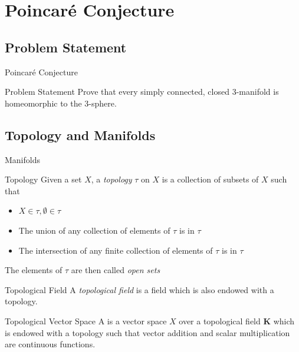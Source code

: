 \documentclass[handout]{beamer}
\newcommand{\Poincare}{Poincar\'{e}}
\begin{document}
  \section{\Poincare{} Conjecture}
  \subsection{Problem Statement}
  \begin{frame}{\Poincare{} Conjecture}
      \begin{block}{Problem Statement}
          Prove that every simply connected, closed 3-manifold is
          homeomorphic to the 3-sphere.
      \end{block}
  \end{frame}
  \subsection{Topology and Manifolds}
  \begin{frame}{Manifolds}
      \linespread{0.9}
      \pause
      \begin{block}{Topology}
          Given a set $X$, a \textit{topology} $\tau$ on $X$ is a collection of
          subsets of $X$ such that
          \begin{itemize}
              \item $X \in \tau, \emptyset \in \tau$
              \item The union of any collection of elements of $\tau$ is in
                  $\tau$
              \item The intersection of any \alert{finite} collection of
                  elements of $\tau$ is in $\tau$
          \end{itemize}
          The elements of $\tau$ are then called \textit{open sets}
      \end{block}
      \pause
      \begin{block}{Topological Field}
          A \textit{topological field} is a field which is also endowed with a
          topology.
      \end{block}
      \pause
      \begin{block}{Topological Vector Space}
          A  is a vector space $X$ over a
          topological field $\mathbf{K}$ which is endowed with a topology such
          that vector addition and scalar multiplication are continuous
          functions.
      \end{block}
  \end{frame}
\end{document}
